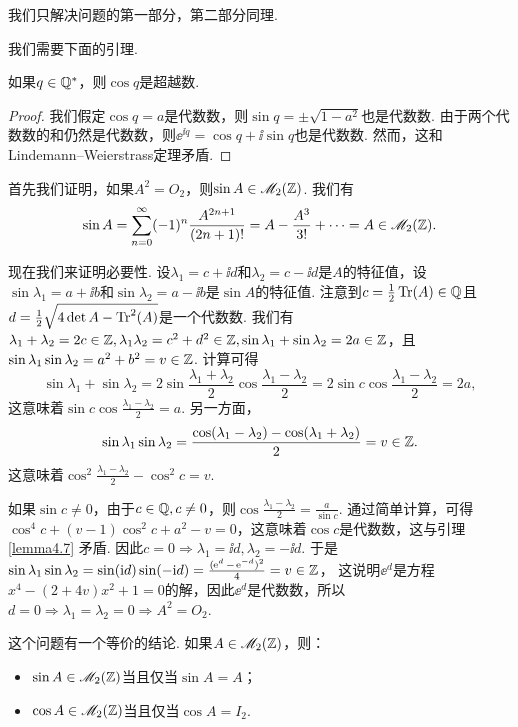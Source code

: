 \begin{solution}
  我们只解决问题的第一部分，第二部分同理.

  我们需要下面的引理.
  \begin{mybox}
    \begin{lemma}
      如果$q\in\mathbb Q^\ast$，则$\cos q$是超越数.
    \end{lemma}
  \end{mybox}
  \begin{proof}
    我们假定$\cos q=a$是代数数，则$\sin q=\pm\sqrt{1-a^2}$也是代数数. 由于两个代数数的和仍然是代数数，则$\ee^{\ii q}=\cos q+\ii\sin q$也是代数数. 然而，这和Lindemann--Weierstrass定理矛盾.
  \end{proof}

  首先我们证明，如果$A^2=O_2$，则$\sin A\in\mathscr M_2(\mathbb Z)$. 我们有
  \[
    \sin A = \sum_{n=0}^\infty (-1)^n \frac{A^{2n+1}}{(2n+1)!} = A - \frac{A^3}{3!} + \cdots = A\in\mathscr M_2(\mathbb Z).
  \]

  现在我们来证明必要性. 设$\lambda_1=c+\ii d$和$\lambda_2=c-\ii d$是$A$的特征值，设$\sin \lambda_1=a+\ii b$和$\sin\lambda_2=a-\ii b$是$\sin A$的特征值. 注意到$c=\frac12\operatorname{Tr}(A)\in\mathbb Q$且$d=\frac12\sqrt{4\det A-\operatorname{Tr}^2(A)}$是一个代数数. 我们有$\lambda_1+\lambda_2=2c\in\mathbb Z,\lambda_1\lambda_2
  =c^2+d^2\in\mathbb Z,\sin\lambda_1+\sin\lambda_2=2a\in\mathbb Z $，且$\sin\lambda_1\sin\lambda_2=a^2+b^2=v\in\mathbb Z$. 计算可得
  \[
    \sin\lambda_1 + \sin\lambda_2 = 2\sin\frac{\lambda_1+\lambda_2}2\cos\frac{\lambda_1
    -\lambda_2}2 = 2\sin c\cos\frac{\lambda_1-\lambda_2}2 = 2a,
  \]
  这意味着$\sin c\cos\frac{\lambda_1-\lambda_2}2=a$. 另一方面，
  \[
    \sin \lambda_1 \sin\lambda_2 = \frac{\cos(\lambda_1-\lambda_2)-\cos(\lambda_1
    +\lambda_2)}2 = v \in \mathbb Z.
  \]
  这意味着$\cos^2\frac{\lambda_1-\lambda_2}2-\cos^2c=v$.

  如果$\sin c\ne0$，由于$c\in\mathbb Q,c\ne0$，则$\cos\frac{\lambda_1-\lambda_2}2
  =\frac a{\sin c}$. 通过简单计算，可得$\cos^4c+(v-1)\cos^2c+a^2-v=0$，这意味着$\cos c$是代数数，这与引理 \ref{lemma4.7} 矛盾. 因此$c=0\Rightarrow\lambda_1=\ii d,\lambda_2=-\ii d$. 于是$\sin\lambda_1\sin\lambda_2=\sin(\mathrm i d)\sin(-\mathrm i d)=\frac{(\operatorname{\!\!\;\mathrm e}^d-\operatorname{\!\!\;\mathrm e}^{-d})^2}4=v\in\mathbb Z$， 这说明$\ee^d$是方程$x^4-(2+4v)x^2+1=0$的解，因此$\ee^d$是代数数，所以$d=0\Rightarrow\lambda_1=\lambda_2=0\Rightarrow A^2=O_2$.
\end{solution}

\begin{remark}
  这个问题有一个等价的结论. 如果$A\in\mathscr M_2(\mathbb Z)$，则：
  \begin{itemize}
    \item $\sin A\in\mathscr M_2(\mathbb Z)$当且仅当$\sin A=A$；
    \item $\cos A\in\mathscr M_2(\mathbb Z)$当且仅当$\cos A=I_2$.
  \end{itemize}
\end{remark}

